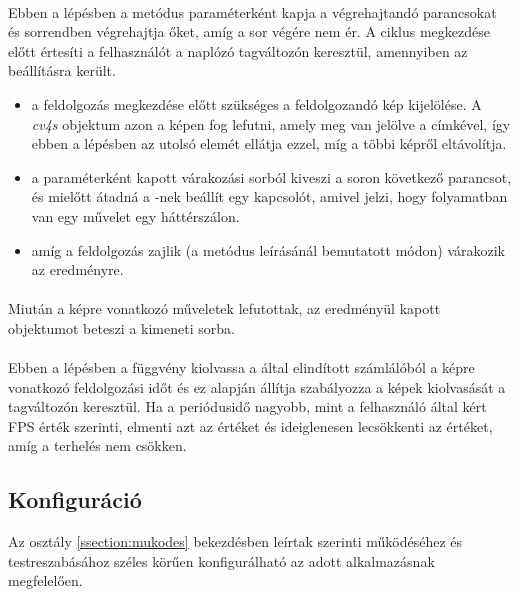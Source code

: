 \paragraph{} Ebben a lépésben a metódus paraméterként kapja a végrehajtandó parancsokat és sorrendben végrehajtja őket, amíg a sor végére nem ér. A ciklus megkezdése előtt értesíti a felhasználót a naplózó tagváltozón keresztül, amennyiben az beállításra került. 
\begin{itemize}
	\item {} a feldolgozás megkezdése előtt szükséges a feldolgozandó kép kijelölése. A \emph{cv4s}  objektum azon a képen fog lefutni, amely meg van jelölve a  címkével, így ebben a lépésben az  utolsó elemét ellátja ezzel, míg a többi képről eltávolítja.
	\item {} a paraméterként kapott várakozási sorból kiveszi a soron következő parancsot, és mielőtt átadná a -nek beállít egy kapcsolót, amivel jelzi, hogy folyamatban van egy művelet egy háttérszálon.
	\item {} amíg a feldolgozás zajlik (a  metódus leírásánál bemutatott módon) várakozik az eredményre.
\end{itemize}
\paragraph{} Miután a képre vonatkozó műveletek lefutottak, az eredményül kapott  objektumot beteszi a kimeneti sorba.
\paragraph{} Ebben a lépésben a függvény kiolvassa a  által elindított számlálóból a képre vonatkozó feldolgozási időt és ez alapján állítja szabályozza a képek kiolvasását a  tagváltozón keresztül. Ha a periódusidő nagyobb, mint a felhasználó által kért FPS érték szerinti, elmenti azt az értéket és ideiglenesen lecsökkenti az értéket, amíg a terhelés nem csökken. 

\subsection{Konfiguráció}

Az osztály \ref{ssection:mukodes} bekezdésben leírtak szerinti működéséhez és testreszabásához széles körűen konfigurálható az adott alkalmazásnak megfelelően.

